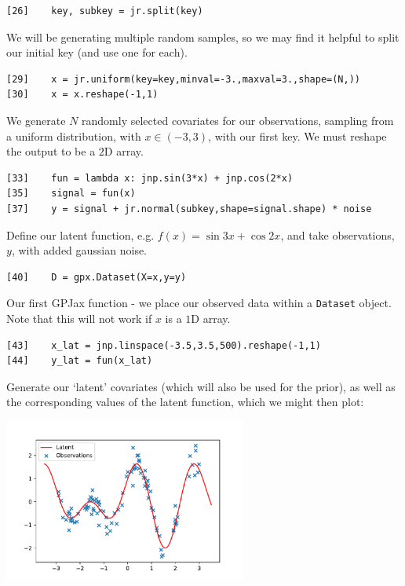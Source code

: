 \documentclass[12pt]{article}
\begin{document}
    \begin{verbatim}[26]    key, subkey = jr.split(key)\end{verbatim}
    \begin{bestbox}
        We will be generating multiple random samples, so we may find it helpful to split our initial key (and use one for each). 
    \end{bestbox}
    \begin{verbatim}[29]    x = jr.uniform(key=key,minval=-3.,maxval=3.,shape=(N,))
[30]    x = x.reshape(-1,1)\end{verbatim}
    \begin{bestbox}
        We generate $N$ randomly selected covariates for our observations, sampling from a uniform distribution, with $x\in(-3,3)$, with our first key. We must reshape the output to be a $2$D array.
    \end{bestbox}
    \begin{verbatim}[33]    fun = lambda x: jnp.sin(3*x) + jnp.cos(2*x)
[35]    signal = fun(x)
[37]    y = signal + jr.normal(subkey,shape=signal.shape) * noise\end{verbatim}
    \begin{bestbox}
        Define our latent function, e.g. $f(x) = \sin 3x + \cos 2x$, and take observations, $y$, with added gaussian noise.
    \end{bestbox}
    \begin{verbatim}[40]    D = gpx.Dataset(X=x,y=y)\end{verbatim}
    \begin{bestbox}
        Our first GPJax function - we place our observed data within a \verb|Dataset| object. Note that this will not work if $x$ is a $1$D array.
    \end{bestbox}
    \begin{verbatim}[43]    x_lat = jnp.linspace(-3.5,3.5,500).reshape(-1,1)
[44]    y_lat = fun(x_lat)\end{verbatim}
    \begin{bestbox}
        Generate our `latent' covariates (which will also be used for the prior), as well as the corresponding values of the latent function, which we might then plot:
        \begin{center}
            \includegraphics[width=8cm]{gpjax_introplot.pdf}
        \end{center}
    \end{bestbox}
\end{document}
